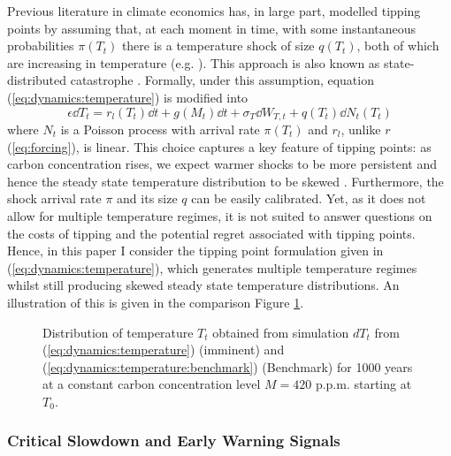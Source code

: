 \documentclass[../../main.tex]{subfiles}
\begin{document}
Previous literature in climate economics has, in large part, modelled tipping points by assuming that, at each moment in time, with some instantaneous probabilities $\pi(T_t)$ there is a temperature shock of size $q(T_t)$, both of which are increasing in temperature (e.g. \citealt{hambel_optimal_2021, van_der_ploeg_climate_2018, lemoine_ambiguous_2016}). This approach is also known as state-distributed catastrophe \citep{li_economics_2024}. Formally, under this assumption, equation (\ref{eq:dynamics:temperature}) is modified into \begin{equation} \label{eq:dynamics:temperature:benchmark}
    \epsilon \dd{T}_t = r_l(T_t) \dd{t} + g(M_t) \dd{t} + \sigma_T \dd{W}_{T, t} + q(T_t) \dd{N}_{t}(T_t)
\end{equation} where $N_t$ is a Poisson process with arrival rate $\pi(T_t)$ and $r_l$, unlike $r$ (\ref{eq:forcing}), is linear. This choice captures a key feature of tipping points: as carbon concentration rises, we expect warmer shocks to be more persistent and hence the steady state temperature distribution to be skewed \citep{ipcc_climate_2023}. Furthermore, the shock arrival rate $\pi$ and its size $q$ can be easily calibrated. Yet, as it does not allow for multiple temperature regimes, it is not suited to answer questions on the costs of tipping and the potential regret associated with tipping points. Hence, in this paper I consider the tipping point formulation given in (\ref{eq:dynamics:temperature}), which generates multiple temperature regimes whilst still producing skewed steady state temperature distributions. An illustration of this is given in the comparison Figure \ref{fig:density-comparison}.

\begin{figure}[htbp]
    \centering
    
    \caption{Distribution of temperature $T_t$ obtained from simulation $dT_t$ from (\ref{eq:dynamics:temperature}) (imminent) and (\ref{eq:dynamics:temperature:benchmark}) (Benchmark) for 1000 years at a constant carbon concentration level $M = 420$ p.p.m. starting at $T_0$.}
    \label{fig:density-comparison}
\end{figure} 


\iffalse
\subsubsection{Critical Slowdown and Early Warning Signals}
\end{document}
